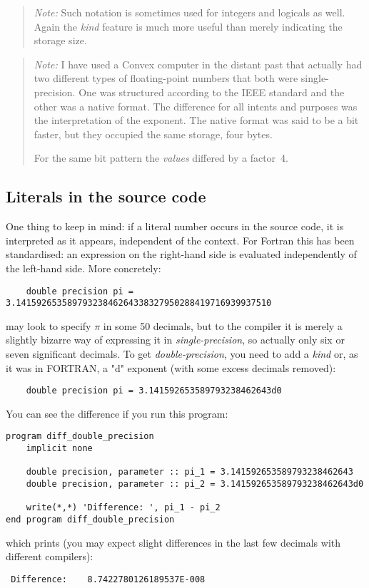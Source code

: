 \begin{quote}
\emph{Note:} Such notation is sometimes used for integers and logicals as well. Again
the \emph{kind} feature is much more useful than merely indicating the storage size.
\end{quote}

\begin{quote}
\emph{Note:} I have used a Convex computer in the distant past that actually had two
different types of floating-point numbers that both were single-precision. One was
structured according to the IEEE standard and the other was a native format. The difference
for all intents and purposes was the interpretation of the exponent. The native format
was said to be a bit faster, but they occupied the same storage, four bytes.

For the same bit pattern the \emph{values} differed by a factor~4.
\end{quote}

\subsection{Literals in the source code}
One thing to keep in mind: if a literal number occurs in the source code, it is interpreted
as it appears, independent of the context. For Fortran this has been standardised: an expression
on the right-hand side is evaluated independently of the left-hand side. More concretely:
\begin{verbatim}
    double precision pi = 3.14159265358979323846264338327950288419716939937510
\end{verbatim}
\noindent may look to specify $\pi$ in some 50 decimals, but to the compiler it is
merely a slightly bizarre way of expressing it in \emph{single-precision}, so actually
only six or seven significant decimals. To get \emph{double-precision}, you need to
add a \emph{kind} or, as it was in FORTRAN, a "d" exponent (with some excess decimals removed):
\begin{verbatim}
    double precision pi = 3.141592653589793238462643d0
\end{verbatim}

You can see the difference if you run this program:
\begin{verbatim}
program diff_double_precision
    implicit none

    double precision, parameter :: pi_1 = 3.141592653589793238462643
    double precision, parameter :: pi_2 = 3.141592653589793238462643d0

    write(*,*) 'Difference: ', pi_1 - pi_2
end program diff_double_precision
\end{verbatim}
\noindent which prints (you may expect slight differences in the last few decimals with
different compilers):
\begin{verbatim}
 Difference:    8.7422780126189537E-008
\end{verbatim}

